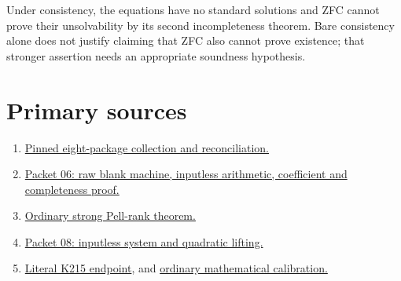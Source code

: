 \documentclass[11pt]{article}
\begin{document}
Under consistency, the equations have no standard solutions and ZFC cannot prove their unsolvability by its second incompleteness theorem. Bare consistency alone does not justify claiming that ZFC also cannot prove existence; that stronger assertion needs an appropriate soundness hypothesis.

\section*{Primary sources}
\begingroup\footnotesize
\begin{enumerate}\setlength{\itemsep}{0pt}\setlength{\parsep}{0pt}
\item \href{https://github.com/VladimirReshetnikov/ProveIt/tree/3b201cdea32d2c816f5f3d20734051f25fd3ef14/SetTheory/Cardinals/docs/reports/hilbert-tenth-problem/con-zfc-diophantine-forms}{Pinned eight-package collection and reconciliation.}
\item \href{https://github.com/VladimirReshetnikov/ProveIt/blob/3b201cdea32d2c816f5f3d20734051f25fd3ef14/SetTheory/Cardinals/docs/reports/hilbert-tenth-problem/con-zfc-diophantine-forms/06-blank67/report.tex}{Packet 06: raw blank machine, inputless arithmetic, coefficient and completeness proof.}
\item \href{https://github.com/VladimirReshetnikov/ProveIt/blob/3b201cdea32d2c816f5f3d20734051f25fd3ef14/Computability/HilbertTenthProblem/Papers/1980/PELL_RELAXED_AUXILIARY_PROOF.md}{Ordinary strong Pell-rank theorem.}
\item \href{https://github.com/VladimirReshetnikov/ProveIt/blob/3b201cdea32d2c816f5f3d20734051f25fd3ef14/SetTheory/Cardinals/docs/reports/hilbert-tenth-problem/con-zfc-diophantine-forms/08-start-only67/diophantine_zfc.tex}{Packet 08: inputless system and quadratic lifting.}
\item \href{https://github.com/VladimirReshetnikov/ProveIt/blob/3b201cdea32d2c816f5f3d20734051f25fd3ef14/Computability/BusyBeaver/Lean/BusyBeaver/ZFC/KEndpoint215.lean}{Literal K215 endpoint}, and
\href{https://github.com/VladimirReshetnikov/ProveIt/blob/3b201cdea32d2c816f5f3d20734051f25fd3ef14/Computability/BusyBeaver/Research/ZFC/candidate-k215/proof.md}{ordinary mathematical calibration.}
\end{enumerate}
\endgroup
\end{document}
